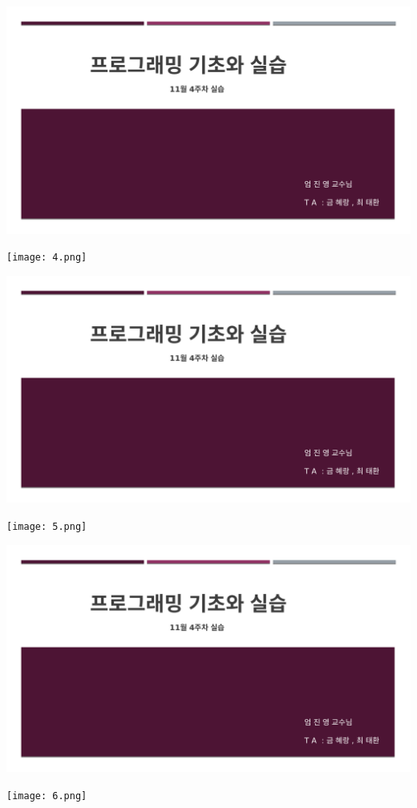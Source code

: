 \documentclass[11pt,a4paper]{article}
\begin{document}
\begin{enumerate}
\includegraphics[page=6, width=\textwidth]{1.pdf}
	
\texttt{[image: 4.png]}	


\includegraphics[page=7, width=\textwidth]{1.pdf}
	
\texttt{[image: 5.png]}	

\includegraphics[page=8, width=\textwidth]{1.pdf}
	
\texttt{[image: 6.png]}	

\end{enumerate}
\end{document}
